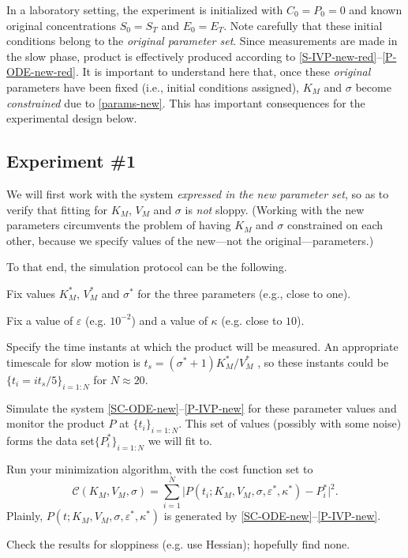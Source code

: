 \documentclass[11pt]{article}
\newcommand{\eps}{\varepsilon}
\begin{document}
In a laboratory setting,
the experiment is initialized with $C_0 = P_0 = 0$
and known original concentrations $S_0=S_T$ and $E_0=E_T$.
Note carefully that these initial conditions
belong to the \emph{original parameter set}.
Since measurements are made in the slow phase,
product is effectively produced
according to \eqref{S-IVP-new-red}--\eqref{P-ODE-new-red}.
It is important to understand here that,
once these \emph{original} parameters have been fixed
(i.e., initial conditions assigned),
$K_M$ and $\sigma$ become \emph{constrained} due to \eqref{params-new}.
This has important consequences
for the experimental design below.

\subsection{Experiment \#1}
%
We will first work with the system
\textit{expressed in the new parameter set},
so as to verify that fitting for $K_M$, $V_M$ and $\sigma$
is \textit{not} sloppy.
(Working with the new parameters circumvents the problem
of having $K_M$ and $\sigma$ constrained on each other,
because we specify values of the new---not the original---parameters.)

To that end, the simulation protocol can be the following.

Fix values $K^*_M$, $V^*_M$ and $\sigma^*$ for the three parameters
(e.g., close to one).

Fix a value of $\eps$ (e.g. $10^{-2}$) and a value of $\kappa$
(e.g. close to $10$).

Specify the time instants at which the product will be measured.
An appropriate timescale for slow motion
is $t_s = (\sigma^*+1)K^*_M/V^*_M$ \cite{SS89},
so these instants could be $\{t_i = i t_s/5\}_{i=1:N}$
for $N \approx 20$.

Simulate the system \eqref{SC-ODE-new}--\eqref{P-IVP-new}
for these parameter values and monitor the product $P$
at $\{t_i\}_{i=1:N}$.
This set of values (possibly with some noise)
forms the data set$\{P^*_i\}_{i=1:N}$ we will fit to.

Run your minimization algorithm,
with the cost function set to
%
\[
 \mathcal{C}(K_M,V_M,\sigma)
=
 \sum_{i=1}^N
 \vert
 P(t_i ; K_M,V_M,\sigma,\eps^*,\kappa^*)
-
 P^*_i
 \vert^2 .
\]
%
Plainly, $P(t ; K_M,V_M,\sigma,\eps^*,\kappa^*)$
is generated by \eqref{SC-ODE-new}--\eqref{P-IVP-new}.

Check the results for sloppiness (e.g. use Hessian);
hopefully find none.
\end{document}
